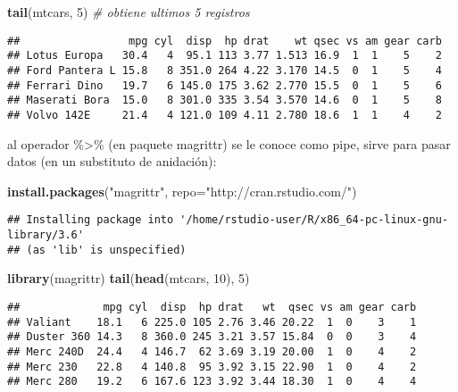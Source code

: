\documentclass[]{book}
\newenvironment{Shaded}{\begin{snugshade}}{\end{snugshade}}
\newcommand{\CommentTok}[1]{\textcolor[rgb]{0.56,0.35,0.01}{\textit{#1}}}
\newcommand{\DataTypeTok}[1]{\textcolor[rgb]{0.13,0.29,0.53}{#1}}
\newcommand{\DecValTok}[1]{\textcolor[rgb]{0.00,0.00,0.81}{#1}}
\newcommand{\KeywordTok}[1]{\textcolor[rgb]{0.13,0.29,0.53}{\textbf{#1}}}
\newcommand{\NormalTok}[1]{#1}
\newcommand{\StringTok}[1]{\textcolor[rgb]{0.31,0.60,0.02}{#1}}
\begin{document}
\begin{Shaded}
\begin{Highlighting}[]
\KeywordTok{tail}\NormalTok{(mtcars, }\DecValTok{5}\NormalTok{) }\CommentTok{# obtiene ultimos 5 registros}
\end{Highlighting}
\end{Shaded}

\begin{verbatim}
##                 mpg cyl  disp  hp drat    wt qsec vs am gear carb
## Lotus Europa   30.4   4  95.1 113 3.77 1.513 16.9  1  1    5    2
## Ford Pantera L 15.8   8 351.0 264 4.22 3.170 14.5  0  1    5    4
## Ferrari Dino   19.7   6 145.0 175 3.62 2.770 15.5  0  1    5    6
## Maserati Bora  15.0   8 301.0 335 3.54 3.570 14.6  0  1    5    8
## Volvo 142E     21.4   4 121.0 109 4.11 2.780 18.6  1  1    4    2
\end{verbatim}

al operador \%\textgreater{}\% (en paquete magrittr) se le conoce como pipe, sirve para pasar datos (en un substituto de anidación):

\begin{Shaded}
\begin{Highlighting}[]
\KeywordTok{install.packages}\NormalTok{(}\StringTok{"magrittr"}\NormalTok{, }\DataTypeTok{repo=}\StringTok{"http://cran.rstudio.com/"}\NormalTok{)}
\end{Highlighting}
\end{Shaded}

\begin{verbatim}
## Installing package into '/home/rstudio-user/R/x86_64-pc-linux-gnu-library/3.6'
## (as 'lib' is unspecified)
\end{verbatim}

\begin{Shaded}
\begin{Highlighting}[]
\KeywordTok{library}\NormalTok{(magrittr)}
\KeywordTok{tail}\NormalTok{(}\KeywordTok{head}\NormalTok{(mtcars, }\DecValTok{10}\NormalTok{), }\DecValTok{5}\NormalTok{)}
\end{Highlighting}
\end{Shaded}

\begin{verbatim}
##             mpg cyl  disp  hp drat   wt  qsec vs am gear carb
## Valiant    18.1   6 225.0 105 2.76 3.46 20.22  1  0    3    1
## Duster 360 14.3   8 360.0 245 3.21 3.57 15.84  0  0    3    4
## Merc 240D  24.4   4 146.7  62 3.69 3.19 20.00  1  0    4    2
## Merc 230   22.8   4 140.8  95 3.92 3.15 22.90  1  0    4    2
## Merc 280   19.2   6 167.6 123 3.92 3.44 18.30  1  0    4    4
\end{verbatim}
\end{document}
